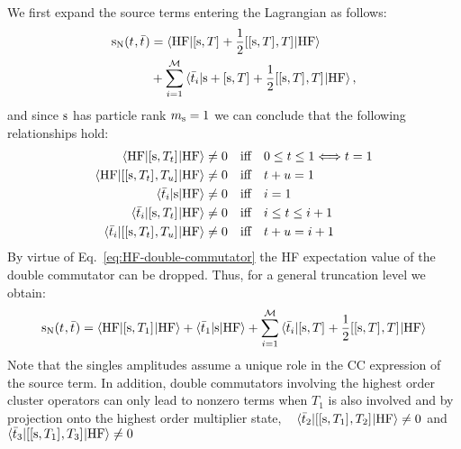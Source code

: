 We first expand the source terms entering the Lagrangian as follows:
\begin{equation}
  \begin{aligned}
  \mathrm{s}_{\mathrm{N}}(t_{}, \bar{t}_{}) &=
  \braket{\mathrm{HF} | [ \mathrm{s}, T ]^{} + \frac{1}{2}[ [ \mathrm{s}, T ]^{}, T ]^{} | \mathrm{HF}} \\
  &+ \sum_{i=1}^{\mathcal{M}}\braket{\bar{t}_{i} | \mathrm{s} + [ \mathrm{s}, T ]^{} +
  \frac{1}{2}[ [ \mathrm{s}, T ]^{}, T ]^{} | \mathrm{HF}},
  \end{aligned}
\end{equation}
and since $\mathrm{s}$ has particle rank $m_{\mathrm{s}} = 1$ we can conclude that the
following relationships hold:
\begin{subequations}
\begin{align}
  \braket{\mathrm{HF} |
  [ \mathrm{s}, T_t ]^{}
  | \mathrm{HF}} &\neq 0 \quad \text{iff} \quad 0 \leq t \leq 1 \Longleftrightarrow t = 1 \\
  \braket{\mathrm{HF} |
  [ [ \mathrm{s}, T_t ]^{}, T_u ]^{}
  | \mathrm{HF}} &\neq 0 \quad \text{iff} \quad t + u = 1
  \label{eq:HF-double-commutator} \\
  \braket{\bar{t}_{i} |
  \mathrm{s}
  | \mathrm{HF} } &\neq 0 \quad \text{iff} \quad i = 1 \\
  \braket{\bar{t}_{i} |
  [ \mathrm{s}, T_t ]^{}
  | \mathrm{HF} } &\neq 0 \quad \text{iff} \quad i \leq t \leq i + 1 \\
  \braket{\bar{t}_{i} |
  [ [ \mathrm{s}, T_t ]^{}, T_u ]^{}
  | \mathrm{HF} } &\neq 0 \quad \text{iff} \quad t + u = i + 1
\end{align}
\end{subequations}
By virtue of Eq.~\eqref{eq:HF-double-commutator} the \acrshort{HF}
expectation value of the double commutator can be dropped. Thus, for a
general truncation level we obtain:
\begin{equation}\label{eq:source-term}
  \mathrm{s}_{\mathrm{N}}(t_{}, \bar{t}_{}) =
  \braket{\mathrm{HF} | [ \mathrm{s}, T_1 ]^{} | \mathrm{HF}}
  + \braket{\bar{t}_{1} | \mathrm{s} | \mathrm{HF}}
  + \sum_{i=1}^{\mathcal{M}}\braket{\bar{t}_{i} | [ \mathrm{s}, T ]^{} + \frac{1}{2}[ [ \mathrm{s}, T ]^{}, T ]^{} | \mathrm{HF}}
\end{equation}
Note that the singles amplitudes assume a unique role in the \acrshort{CC}
expression of the source term.
In addition, double commutators involving the highest order cluster
operators can only lead to nonzero terms when $T_1$ is also involved and
by projection onto the highest order multiplier state, \eg~
$\braket{\bar{t}_{2} | [ [ \mathrm{s}, T_1 ]^{}, T_2 ]^{} |
\mathrm{HF}} \neq 0$ and $\braket{\bar{t}_{3} |
[ [ \mathrm{s}, T_1 ]^{}, T_3 ]^{} | \mathrm{HF}} \neq 0$

